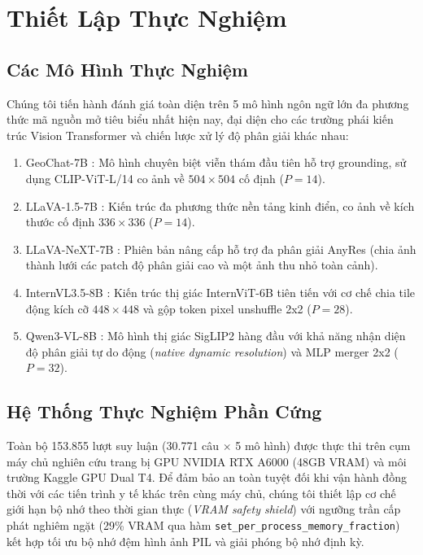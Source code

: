 \section{Thiết Lập Thực Nghiệm}
\label{sec:experiments}

\subsection{Các Mô Hình Thực Nghiệm}
Chúng tôi tiến hành đánh giá toàn diện trên 5 mô hình ngôn ngữ lớn đa phương thức mã nguồn mở tiêu biểu nhất hiện nay, đại diện cho các trường phái kiến trúc Vision Transformer và chiến lược xử lý độ phân giải khác nhau:
\begin{enumerate}
    \item GeoChat-7B \cite{geochat2024}: Mô hình chuyên biệt viễn thám đầu tiên hỗ trợ grounding, sử dụng CLIP-ViT-L/14 co ảnh về $504 \times 504$ cố định ($P = 14$).
    \item LLaVA-1.5-7B \cite{llava15}: Kiến trúc đa phương thức nền tảng kinh điển, co ảnh về kích thước cố định $336 \times 336$ ($P = 14$).
    \item LLaVA-NeXT-7B \cite{llavanext2024}: Phiên bản nâng cấp hỗ trợ đa phân giải AnyRes (chia ảnh thành lưới các patch độ phân giải cao và một ảnh thu nhỏ toàn cảnh).
    \item InternVL3.5-8B \cite{internvl2025}: Kiến trúc thị giác InternViT-6B tiên tiến với cơ chế chia tile động kích cỡ $448 \times 448$ và gộp token pixel unshuffle 2x2 ($P = 28$).
    \item Qwen3-VL-8B \cite{qwen2025vl}: Mô hình thị giác SigLIP2 hàng đầu với khả năng nhận diện độ phân giải tự do động (\textit{native dynamic resolution}) và MLP merger 2x2 ($P = 32$).
\end{enumerate}

\subsection{Hệ Thống Thực Nghiệm Phần Cứng}
Toàn bộ 153.855 lượt suy luận (30.771 câu $\times$ 5 mô hình) được thực thi trên cụm máy chủ nghiên cứu trang bị GPU NVIDIA RTX A6000 (48GB VRAM) và môi trường Kaggle GPU Dual T4. Để đảm bảo an toàn tuyệt đối khi vận hành đồng thời với các tiến trình y tế khác trên cùng máy chủ, chúng tôi thiết lập cơ chế giới hạn bộ nhớ theo thời gian thực (\textit{VRAM safety shield}) với ngưỡng trần cấp phát nghiêm ngặt (29\% VRAM qua hàm \texttt{set\_per\_process\_memory\_fraction}) kết hợp tối ưu bộ nhớ đệm hình ảnh PIL và giải phóng bộ nhớ định kỳ.

